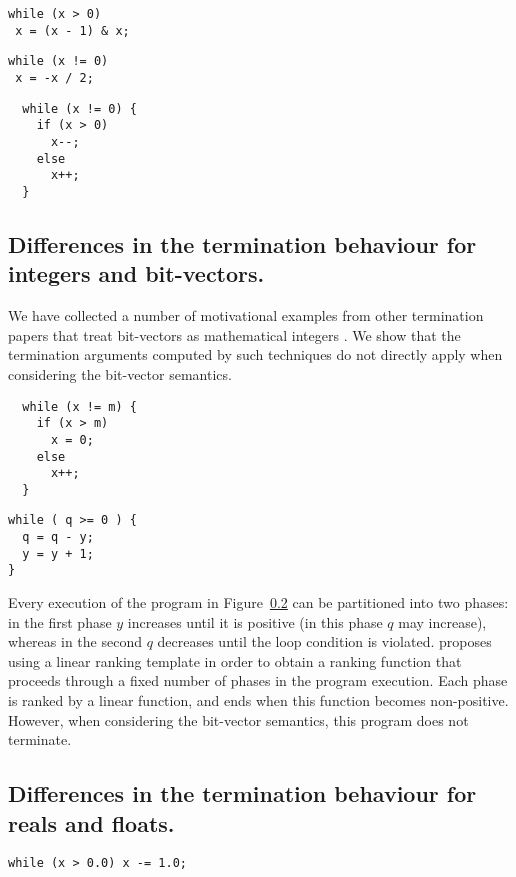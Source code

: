 \documentclass[preprint]{sigplanconf}
\theoremstyle{definition}
\begin{document}
\begin{lstlisting}
while (x > 0)
 x = (x - 1) & x;
\end{lstlisting}

\begin{lstlisting}
while (x != 0)
 x = -x / 2;
\end{lstlisting}

\begin{lstlisting}
  while (x != 0) {
    if (x > 0)
      x--;
    else
      x++;
  }
\end{lstlisting}

\subsection{Differences in the termination behaviour for integers and bit-vectors.}
We have collected a number of motivational examples from other termination papers that treat bit-vectors as mathematical integers \cite{DBLP:conf/tacas/LeikeH14,DBLP:conf/tacas/CookSZ13}. 
We show that the termination arguments computed by such techniques do not directly apply when considering the bit-vector semantics.

\begin{lstlisting}
  while (x != m) {
    if (x > m)
      x = 0;
    else
      x++;
  }
\end{lstlisting}

\begin{lstlisting}
while ( q >= 0 ) {
  q = q - y;
  y = y + 1;
}
\end{lstlisting}

Every execution of the program in Figure~\ref{} can be partitioned into two phases: in the first phase $y$ increases
until it is positive (in this phase $q$ may increase), whereas in the second $q$ decreases until the loop condition is violated. 
\cite{DBLP:conf/tacas/LeikeH14} proposes using a linear ranking template in order to obtain a ranking function that proceeds
through a fixed number of phases in the program execution. Each phase is ranked by a linear function, and ends when this function becomes non-positive.
However, when considering the bit-vector semantics, this program does not terminate.

\subsection{Differences in the termination behaviour for reals and floats.}
\begin{lstlisting}
while (x > 0.0) x -= 1.0;
\end{lstlisting}
\end{document}
